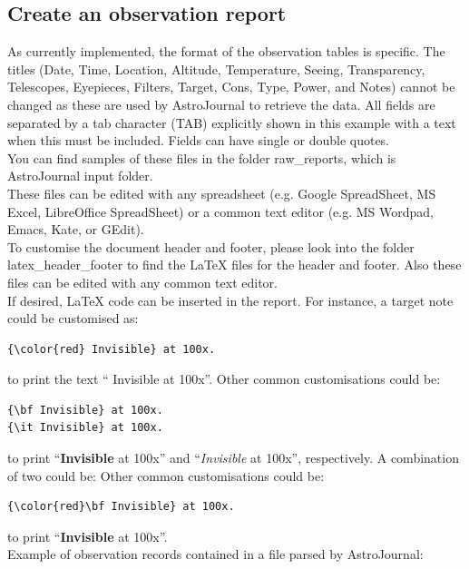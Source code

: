 \subsection{Create an observation report}
\label{sec:Create an observation report}
As currently implemented, the format of the observation tables is specific. The titles (Date, Time, Location, Altitude, Temperature, Seeing, Transparency, Telescopes, Eyepieces, Filters, Target, Cons, Type, Power, and Notes) cannot be changed as these are used by AstroJournal to retrieve the data. All fields are separated by a tab character (TAB) explicitly shown in this example with a text when this must be included. Fields can have single or double quotes.\\
You can find samples of these files in the folder raw\_reports, which is 
AstroJournal input folder.\\
These files can be edited with any spreadsheet (e.g. Google SpreadSheet, MS Excel, LibreOffice SpreadSheet) or a common text editor (e.g. MS Wordpad, Emacs, Kate, or GEdit).\\
To customise the document header and footer, please look into the folder 
latex\_header\_footer to find the LaTeX files for the header and footer. Also these files can be edited with any common text editor.\\
If desired, LaTeX code can be inserted in the report. For instance, a target note could be customised as:
\begin{lstlisting}
{\color{red} Invisible} at 100x.  
\end{lstlisting}
to print the text ``{\color{red} Invisible} at 100x''. Other common customisations could be:
\begin{lstlisting}
{\bf Invisible} at 100x.  
{\it Invisible} at 100x.  
\end{lstlisting}
to print ``{\bf Invisible} at 100x'' and ``{\it Invisible} at 100x'', respectively. A combination of two could be: 
Other common customisations could be:
\begin{lstlisting}
{\color{red}\bf Invisible} at 100x.  
\end{lstlisting}
to print ``{\color{red}\bf Invisible} at 100x''.\\ 
Example of observation records contained in a file parsed by AstroJournal:\\

